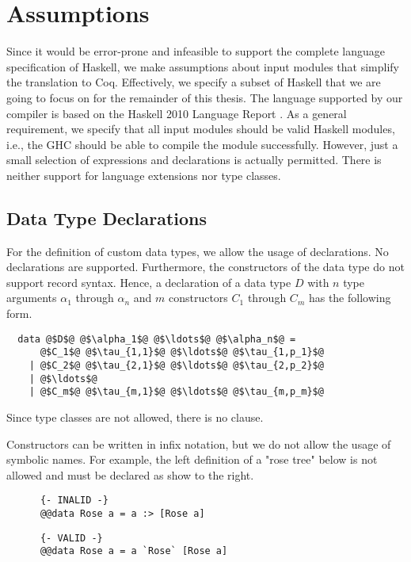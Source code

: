 \section{Assumptions} \label{sec:preliminaries:assumptions}
Since it would be error-prone and infeasible to support the complete language specification of Haskell, we make assumptions about input modules that simplify the translation to Coq.
Effectively, we specify a subset of Haskell that we are going to focus on for the remainder of this thesis.
The language supported by our compiler is based on the Haskell 2010 Language Report \citep{Marlow:2010}.
As a general requirement, we specify that all input modules should be valid Haskell modules, i.e., the GHC should be able to compile the module successfully.
However, just a small selection of expressions and declarations is actually permitted.
There is neither support for language extensions nor type classes.

\subsection{Data Type Declarations} \label{sec:preliminaries:assumptions:data-decl}
For the definition of custom data types, we allow the usage of  declarations.
No  declarations are supported.
Furthermore, the constructors of the data type do not support record syntax.
Hence, a declaration of a data type $D$ with $n$ type arguments $\alpha_1$ through $\alpha_n$ and $m$ constructors $C_1$ through $C_m$ has the following form.
\begin{verbatim}
  data @$D$@ @$\alpha_1$@ @$\ldots$@ @$\alpha_n$@ =
      @$C_1$@ @$\tau_{1,1}$@ @$\ldots$@ @$\tau_{1,p_1}$@
    | @$C_2$@ @$\tau_{2,1}$@ @$\ldots$@ @$\tau_{2,p_2}$@
    | @$\ldots$@
    | @$C_m$@ @$\tau_{m,1}$@ @$\ldots$@ @$\tau_{m,p_m}$@
\end{verbatim}
Since type classes are not allowed, there is no  clause.

Constructors can be written in infix notation, but we do not allow the usage of symbolic names.
For example, the left definition of a "rose tree" below is not allowed and must be declared as show to the right.
\begin{center}
  \begin{minipage}[t]{0.35\textwidth}
    \begin{verbatim}
      {- INALID -}
      @@data Rose a = a :> [Rose a]
    \end{verbatim}
  \end{minipage}
  \begin{minipage}[t]{0.35\textwidth}
    \begin{verbatim}
      {- VALID -}
      @@data Rose a = a `Rose` [Rose a]
    \end{verbatim}
  \end{minipage}
\end{center}

